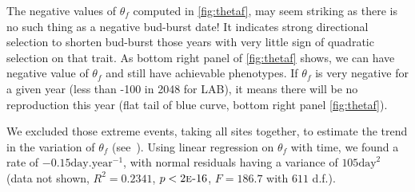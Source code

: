 The negative values of $\theta_f$ computed in \autoref{fig:thetaf}, may seem striking as there is no such thing as a negative bud-burst date! It indicates strong directional selection to shorten bud-burst those years with very little sign of quadratic selection on that trait. As bottom right panel of \autoref{fig:thetaf} shows, we can have negative value of $\theta_f$ and still have achievable phenotypes. If $\theta_f$ is very negative for a given year (less than -100 in 2048 for LAB), it means there will be no reproduction this year (flat tail of blue curve, bottom right panel \autoref{fig:thetaf}).

We excluded those extreme events, taking all sites together, to estimate the trend in the variation of $\theta_f$ (see~). Using linear regression on $\theta_f$ with time, we found a rate of $-0.15 \text{day}.\text{year}^{-1}$, with normal residuals having a variance of $105 \text{day}^2$ (data not shown, $R^2=0.2341$, $p<2\text{\sc{e}-}16$, $F=186.7$ with $611$ d.f.).

